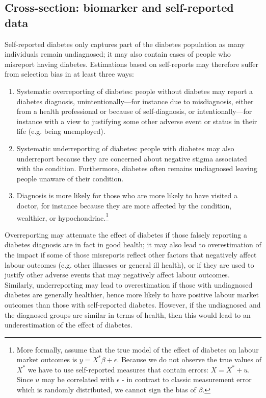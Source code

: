 \subsection{\label{sec:Biomarker Strategy}Cross-section: biomarker and self-reported data}

Self-reported diabetes only captures part of the diabetes population as many individuals remain undiagnosed; it may also contain cases of people who misreport having diabetes.  Estimations based on self-reports may therefore suffer from selection bias in at least three ways:

\begin{enumerate}
\item Systematic overreporting of diabetes: people without diabetes
may report a diabetes diagnosis, unintentionally---for instance due to misdiagnosis, either from a health professional or because of self-diagnosis, or intentionally---for instance with a view to justifying some other adverse event or status in their life (e.g. being unemployed). 
\item Systematic underreporting of diabetes: people with diabetes may also underreport because they are concerned about negative stigma associated with the condition. Furthermore, diabetes often remains undiagnosed leaving people unaware of their condition.
\item Diagnosis is more likely for those who are more likely to have visited a doctor, for instance because they are more affected by the condition, wealthier, or hypochondriac.\footnote{More formally, assume that the true model of the effect of diabetes on labour market outcomes is $y=X^{*}\beta+\epsilon$. Because we do not observe the true values of  $X^{*}$  we have to use self-reported measures that contain errors: $X=X^{*} + u$. Since $u$ may be correlated with $\epsilon$ - in contrast to classic measurement error which is randomly distributed, we cannot sign the bias of  $\beta$.}    
\end{enumerate} 

Overreporting may attenuate the effect of diabetes if those falsely reporting a diabetes diagnosis are in fact in good health; it may also lead to overestimation of the impact if some of those misreports reflect other factors that negatively affect labour outcomes (e.g. other illnesses or general ill health), or if they are used to justify other adverse events that may negatively affect labour outcomes. Similarly, underreporting may lead to overestimation if those with undiagnosed diabetes are generally healthier, hence more likely to have positive labour market outcomes than those with self-reported diabetes. However, if the undiagnosed and the diagnosed groups are similar in terms of health, then this would lead to an underestimation of the effect of diabetes. 

